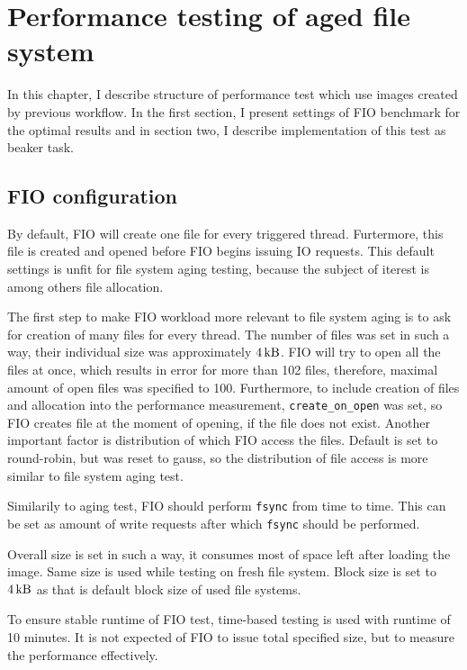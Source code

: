 \documentclass[
  color, %
  table, %
  lof,   %
  lot,   %
]{fithesis3}
\begin{document}
\chapter{Performance testing of aged file system}
\label{fio}
In this chapter, I describe structure of performance test which use images created by previous workflow. In the first section, I present settings of FIO benchmark for the optimal results and in section two, I describe implementation of this test as beaker task.

\section{FIO configuration} 


By default, FIO will create one file for every triggered thread. Furtermore, this file is created and opened before FIO begins issuing IO requests. This default settings is unfit for file system aging testing, because the subject of iterest is among others file allocation.

The first step to make FIO workload more relevant to file system aging is to ask for creation of many files for every thread. The number of files was set in such a way, their individual size was approximately $\SI{4}{\kilo\byte}$. FIO will try to open all the files at once, which results in error for more than 102 files, therefore, maximal amount of open files was specified to 100. Furthermore, to include creation of files and allocation into the performance measurement, \texttt{create\_on\_open} was set, so FIO creates file at the moment of opening, if the file does not exist. Another important factor is distribution of which FIO access the files. Default is set to round-robin, but was reset to gauss, so the distribution of file access is more similar to file system aging test.

Similarily to aging test, FIO should perform \texttt{fsync} from time to time. This can be set as amount of write requests after which \texttt{fsync} should be performed.

Overall size is set in such a way, it consumes most of space left after loading the image. Same size is used while testing on fresh file system. Block size is set to $\SI{4}{\kilo\byte}$ as that is default block size of used file systems.

To ensure stable runtime of FIO test, time-based testing is used with runtime of 10 minutes. It is not expected of FIO to issue total specified size, but to measure the performance effectively.
\end{document}

